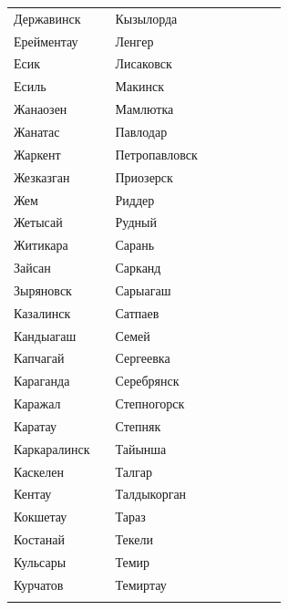 \documentclass[12pt, a4paper]{article}
\begin{document}
\begin{figure}[t]
\scriptsize 
\begin{tabular}[b]{ V{2.8} m{2.0cm} V{2.8} m{6.2cm} V{2.8} m{2.0cm} V{2.8}  m{8.0cm }V{2.8}} 
Державинск &  & Кызылорда &  \\ [0.45cm]
Ерейментау &  & Ленгер &  \\ [0.45cm]
Есик &  & Лисаковск &  \\ [0.45cm]
Есиль &  & Макинск &  \\ [0.45cm]
Жанаозен &  & Мамлютка &  \\ [0.45cm]
Жанатас &  & Павлодар &  \\ [0.45cm]
Жаркент &  & Петропавловск &  \\ [0.45cm]
Жезказган &  & Приозерск &  \\ [0.45cm]
Жем &  & Риддер &  \\ [0.45cm]
Жетысай &  & Рудный &  \\ [0.45cm]
Житикара &  & Сарань &  \\ [0.45cm]
Зайсан &  & Сарканд &  \\ [0.45cm]
Зыряновск &  & Сарыагаш &  \\ [0.45cm]
Казалинск &  & Сатпаев &  \\ [0.45cm]
Кандыагаш &  & Семей &  \\ [0.45cm]
Капчагай &  & Сергеевка &  \\ [0.45cm]
Караганда &  & Серебрянск &  \\ [0.45cm]
Каражал &  & Степногорск &  \\ [0.45cm]
Каратау &  & Степняк &  \\ [0.45cm]
Каркаралинск &  & Тайынша &  \\ [0.45cm]
Каскелен &  & Талгар &  \\ [0.45cm]
Кентау &  & Талдыкорган &  \\ [0.45cm]
Кокшетау &  & Тараз &  \\ [0.45cm]
Костанай &  & Текели &  \\ [0.45cm]
Кульсары &  & Темир &  \\ [0.45cm]
Курчатов &  & Темиртау &  \\ [0.45cm]
\end{tabular}
\end{figure}
\end{document}
